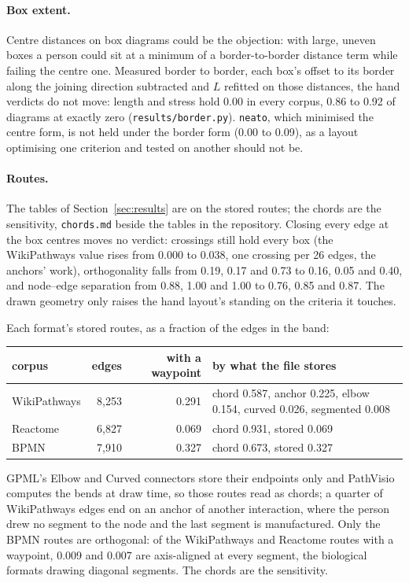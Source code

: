 \documentclass[a4paper,UKenglish]{gd-lipics-v3}
\begin{document}
\paragraph{Box extent.} Centre distances on box diagrams could be the objection: with
large, uneven boxes a person could sit at a minimum of a border-to-border distance term
while failing the centre one. Measured border to border, each box's offset to its border
along the joining direction subtracted and $L$ refitted on those distances, the hand
verdicts do not move: length and stress hold 0.00 in every corpus, 0.86 to 0.92 of
diagrams at exactly zero (\texttt{results/border.py}). \texttt{neato}, which minimised
the centre form, is not held under the border form (0.00 to 0.09), as a layout optimising
one criterion and tested on another should not be.





\paragraph{Routes.} The tables of Section~\ref{sec:results} are on the stored routes; the chords are the
sensitivity, \texttt{chords.md} beside the tables in the repository. Closing every edge at the box centres moves no
verdict: crossings still hold every box (the WikiPathways value rises from 0.000 to 0.038,
one crossing per 26 edges, the anchors' work), orthogonality falls from 0.19, 0.17 and
0.73 to 0.16, 0.05 and 0.40, and node--edge separation from 0.88, 1.00 and 1.00 to 0.76,
0.85 and 0.87. The drawn geometry only raises the hand layout's standing on the criteria
it touches.

Each format's stored routes, as a fraction of the edges in the band:

\begin{center}\scriptsize
\begin{tabular}{lrrp{5.6cm}}
\toprule
corpus & edges & with a waypoint & by what the file stores \\
\midrule
WikiPathways & 8{,}253 & 0.291 & chord 0.587, anchor 0.225, elbow 0.154, curved 0.026, segmented 0.008 \\
Reactome & 6{,}827 & 0.069 & chord 0.931, stored 0.069 \\
BPMN & 7{,}910 & 0.327 & chord 0.673, stored 0.327 \\
\bottomrule
\end{tabular}
\end{center}

GPML's Elbow and Curved connectors store
their endpoints only and PathVisio computes the bends at draw time, so those routes read as
chords; a quarter of WikiPathways edges end on an anchor of another interaction, where the
person drew no segment to the node and the last segment is manufactured. Only the BPMN
routes are orthogonal: of the WikiPathways and Reactome routes with a waypoint, 0.009 and
0.007 are axis-aligned at every segment, the biological formats drawing diagonal segments.
The chords are the sensitivity.
\end{document}
